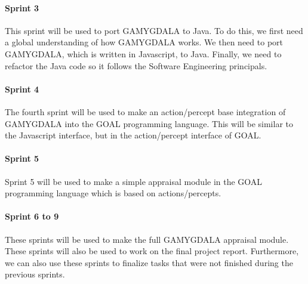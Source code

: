 \paragraph{Sprint 3} This sprint will be used to port GAMYGDALA to Java. To do this, we first need a global understanding of how GAMYGDALA works. We then need to port GAMYGDALA, which is written in Javascript, to Java. Finally, we need to refactor the Java code so it follows the Software Engineering principals.
\paragraph{Sprint 4} The fourth sprint will be used to make an action/percept base integration of GAMYGDALA into the GOAL programming language. This will be similar to the Javascript interface, but in the action/percept interface of GOAL.
\paragraph{Sprint 5} Sprint 5 will be used to make a simple appraisal module in the GOAL programming language which is based on actions/percepts.
\paragraph{Sprint 6 to 9} These sprints will be used to make the full GAMYGDALA appraisal module. These sprints will also be used to work on the final project report. Furthermore, we can also use these sprints to finalize tasks that were not finished during the previous sprints.